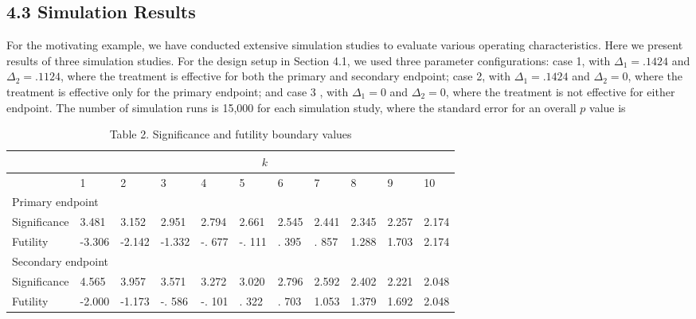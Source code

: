 \documentclass[10pt]{article}
\begin{document}
\subsection*{4.3 Simulation Results}
For the motivating example, we have conducted extensive simulation studies to evaluate various operating characteristics. Here we present results of three simulation studies. For the design setup in Section 4.1, we used three parameter configurations: case 1, with $\Delta_{1}=.1424$ and $\Delta_{2}=.1124$, where the treatment is effective for both the primary and secondary endpoint; case 2, with $\Delta_{1}=.1424$ and $\Delta_{2}=0$, where the treatment is effective only for the primary endpoint; and case 3 , with $\Delta_{1}=0$ and $\Delta_{2}=0$, where the treatment is not effective for either endpoint. The number of simulation runs is 15,000 for each simulation study, where the standard error for an overall $p$ value is

\begin{table}[h]
\begin{center}
\captionsetup{labelformat=empty}
\caption{Table 2. Significance and futility boundary values}
\begin{tabular}[t]{|l|l|l|l|l|l|l|l|l|l|l|}
\hline
\multirow{2}{*}{} & \multicolumn{10}{|c|}{$k$} \\
\hline
 & 1 & 2 & 3 & 4 & 5 & 6 & 7 & 8 & 9 & 10 \\
\hline
\multicolumn{11}{|l|}{Primary endpoint} \\
\hline
Significance & 3.481 & 3.152 & 2.951 & 2.794 & 2.661 & 2.545 & 2.441 & 2.345 & 2.257 & 2.174 \\
\hline
Futility & -3.306 & -2.142 & -1.332 & -. 677 & -. 111 & . 395 & . 857 & 1.288 & 1.703 & 2.174 \\
\hline
\multicolumn{11}{|l|}{Secondary endpoint} \\
\hline
Significance & 4.565 & 3.957 & 3.571 & 3.272 & 3.020 & 2.796 & 2.592 & 2.402 & 2.221 & 2.048 \\
\hline
Futility & -2.000 & -1.173 & -. 586 & -. 101 & . 322 & . 703 & 1.053 & 1.379 & 1.692 & 2.048 \\
\hline
\end{tabular}
\end{center}
\end{table}
\end{document}
